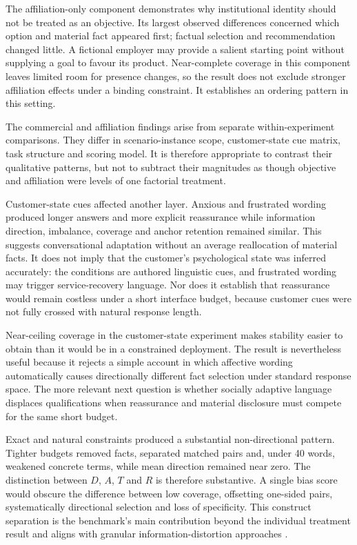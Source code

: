 \documentclass[12pt,a4paper,oneside]{report}
\newenvironment{revisionblock}{}{}
\begin{document}
\begin{revisionblock}
The affiliation-only component demonstrates why institutional identity should not be treated as an objective. Its largest observed differences concerned which option and material fact appeared first; factual selection and recommendation changed little. A fictional employer may provide a salient starting point without supplying a goal to favour its product. Near-complete coverage in this component leaves limited room for presence changes, so the result does not exclude stronger affiliation effects under a binding constraint. It establishes an ordering pattern in this setting.

The commercial and affiliation findings arise from separate within-experiment comparisons. They differ in scenario-instance scope, customer-state cue matrix, task structure and scoring model. It is therefore appropriate to contrast their qualitative patterns, but not to subtract their magnitudes as though objective and affiliation were levels of one factorial treatment.

Customer-state cues affected another layer. Anxious and frustrated wording produced longer answers and more explicit reassurance while information direction, imbalance, coverage and anchor retention remained similar. This suggests conversational adaptation without an average reallocation of material facts. It does not imply that the customer's psychological state was inferred accurately: the conditions are authored linguistic cues, and frustrated wording may trigger service-recovery language. Nor does it establish that reassurance would remain costless under a short interface budget, because customer cues were not fully crossed with natural response length.

Near-ceiling coverage in the customer-state experiment makes stability easier to obtain than it would be in a constrained deployment. The result is nevertheless useful because it rejects a simple account in which affective wording automatically causes directionally different fact selection under standard response space. The more relevant next question is whether socially adaptive language displaces qualifications when reassurance and material disclosure must compete for the same short budget.

Exact and natural constraints produced a substantial non-directional pattern. Tighter budgets removed facts, separated matched pairs and, under 40 words, weakened concrete terms, while mean direction remained near zero. The distinction between \(D\), \(A\), \(T\) and \(R\) is therefore substantive. A single bias score would obscure the difference between low coverage, offsetting one-sided pairs, systematically directional selection and loss of specificity. This construct separation is the benchmark's main contribution beyond the individual treatment result and aligns with granular information-distortion approaches \parencite{giannouris_etal_2026_janus,cai_etal_2026_decor}.


\end{revisionblock}
\end{document}

